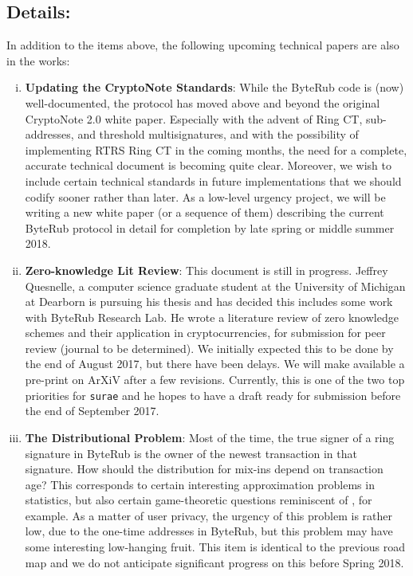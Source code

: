 \documentclass[12pt,english]{mrl}
\theoremstyle{definition}
\numberwithin{equation}{section}
\numberwithin{figure}{section}
\numberwithin{equation}{section}
\numberwithin{equation}{section}
\numberwithin{figure}{section}
\begin{document}
\subsection{Details:}
In addition to the items above, the following upcoming technical papers are also in the works:
\begin{enumerate}[(i)]
\item \textbf{Updating the CryptoNote Standards}: While the ByteRub code is (now) well-documented, the protocol has moved above and beyond the original CryptoNote 2.0 white paper. Especially with the advent of Ring CT, sub-addresses, and threshold multisignatures, and with the possibility of implementing RTRS Ring CT in the coming months, the need for a complete, accurate technical document is becoming quite clear. Moreover, we wish to include certain technical standards in future implementations that we should codify sooner rather than later.  As a low-level urgency project, we will be writing a new white paper (or a sequence of them) describing the current ByteRub protocol in detail for completion by late spring or middle summer 2018.

\item \textbf{Zero-knowledge Lit Review}: This document is still in progress.  Jeffrey Quesnelle, a computer science graduate student at the University of Michigan at Dearborn is pursuing his thesis and has decided this includes some work with ByteRub Research Lab. He wrote a literature review of zero knowledge schemes and their application in cryptocurrencies, for submission for peer review (journal to be determined). We initially expected this to be done by the end of August 2017, but there have been delays. We will make available a pre-print on ArXiV after a few revisions. Currently, this is one of the two top priorities for \texttt{surae} and he hopes to have a draft ready for submission before the end of September 2017.

\item \textbf{The Distributional Problem}: Most of the time, the true signer of a ring signature in ByteRub is the owner of the newest transaction in that signature. How should the distribution for mix-ins depend on transaction age? This corresponds to certain interesting approximation problems in statistics, but also certain game-theoretic questions reminiscent of \cite{T-1955}, for example. As a matter of user privacy, the urgency of this problem is rather low, due to the one-time addresses in ByteRub, but this problem may have some interesting low-hanging fruit. This item is identical to the previous road map and we do not anticipate significant progress on this before Spring 2018.

\end{enumerate}
\end{document}
